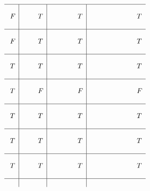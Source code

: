 \documentclass[10pt]{article}
\begin{document}
\[\begin{array}{l|l|l|l}
  \hline & & &  \\
  \ F & \hspace{8mm} T & \hspace{14mm} T & \hspace{24mm} T\\ 
  & & &  \\
  \hline & & &  \\
  \ F & \hspace{8mm} T & \hspace{14mm} T & \hspace{24mm} T\\ 
  & & &  \\
  \hline & & &  \\
  \ T & \hspace{8mm} T & \hspace{14mm} T & \hspace{24mm} T\\ 
  & & &  \\
  \hline & & &  \\
  \ T & \hspace{8mm} F & \hspace{14mm} F & \hspace{24mm} F\\ 
  & & &  \\
  \hline & & &  \\
  \ T & \hspace{8mm} T & \hspace{14mm} T & \hspace{24mm} T\\ 
  & & &  \\
  \hline & & &  \\
  \ T & \hspace{8mm} T & \hspace{14mm} T & \hspace{24mm} T\\ 
  & & &  \\
  \hline & & &  \\
  \ T & \hspace{8mm} T & \hspace{14mm} T & \hspace{24mm} T\\ 
  & & &  \\
  \hline & & &  \\

\end{array}\]
\end{document}
